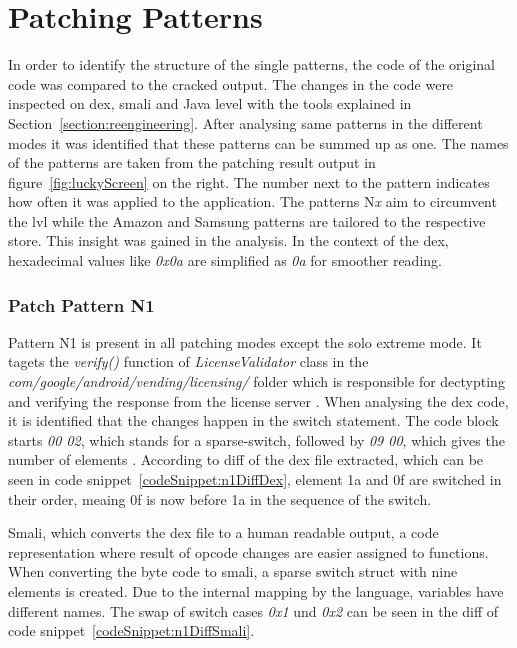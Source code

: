 \section{Patching Patterns} \label{section:luckypatcher-patterns}
In order to identify the structure of the single patterns, the code of the original code was compared to the cracked output.
The changes in the code were inspected on dex, smali and Java level with the tools explained in Section~\ref{section:reengineering}.
After analysing same patterns in the different modes it was identified that these patterns can be summed up as one.
\newline
The names of the patterns are taken from the patching result output in figure~\ref{fig:luckyScreen} on the right.
The number next to the pattern indicates how often it was applied to the application.
The patterns N\textit{x} aim to circumvent the \gls{lvl} while the Amazon and Samsung patterns are tailored to the respective store.
This insight was gained in the analysis.
In the context of the \gls{dex}, hexadecimal values like \textit{0x0a} are simplified as \textit{0a} for smoother reading.


\subsubsection{Patch Pattern N1}
Pattern N1 is present in all patching modes except the solo extreme mode.
It tagets the \textit{verify()} function of \textit{LicenseValidator} class in the \textit{com/google/android/vending/licensing/} folder which is responsible for dectypting and verifying the response from the license server \cite{developersLicensingReference}.
\newline
When analysing the dex code, it is identified that the changes happen in the switch statement.
The code block starts \textit{00 02}, which stands for a sparse-switch, followed by \textit{09 00}, which gives the number of elements \cite{opcodes}.
According to diff of the \gls{dex} file extracted, which can be seen in code snippet~\ref{codeSnippet:n1DiffDex}, element 1a and 0f are switched in their order, meaing 0f is now before 1a in the sequence of the switch.
\newline


Smali, which converts the \gls{dex} file to a human readable output, a code representation where result of opcode changes are easier assigned to functions.
When converting the byte code to smali, a sparse switch struct with nine elements is created.
Due to the internal mapping by the language, variables have different names.
The swap of switch cases \textit{0x1} und \textit{0x2} can be seen in the diff of code snippet~\ref{codeSnippet:n1DiffSmali}.
\newline


